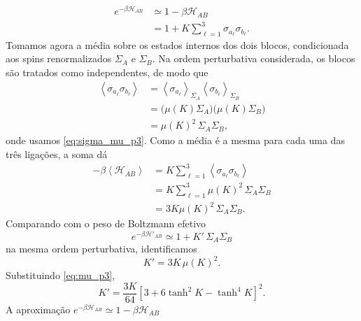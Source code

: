 \documentclass[12pt,a4paper]{article}
\begin{document}
%
\begin{align}
    e^{-\beta\mathcal H_{AB}}
    &\simeq
    1-\beta\mathcal H_{AB}
    \nonumber\\[4pt]
    &=
    1
    +
    K
    \sum_{\ell=1}^{3}
    \sigma_{a_\ell}\sigma_{b_\ell}.
    \label{eq:exp_pert_p3}
\end{align}
%
Tomamos agora a média sobre os estados internos dos dois blocos,
condicionada aos spins renormalizados \(\Sigma_A\) e \(\Sigma_B\). Na
ordem perturbativa considerada, os blocos são tratados como
independentes, de modo que
%
\begin{align}
    \left\langle
        \sigma_{a_\ell}\sigma_{b_\ell}
    \right\rangle
    &=
    \left\langle
        \sigma_{a_\ell}
    \right\rangle_{\Sigma_A}
    \left\langle
        \sigma_{b_\ell}
    \right\rangle_{\Sigma_B}
    \nonumber\\[4pt]
    &=
    \bigl(\mu(K)\Sigma_A\bigr)
    \bigl(\mu(K)\Sigma_B\bigr)
    \nonumber\\[4pt]
    &=
    \mu(K)^2\,\Sigma_A\Sigma_B,
    \label{eq:product_avg_p3}
\end{align}
%
onde usamos \eqref{eq:sigma_mu_p3}. Como a média é a mesma para cada
uma das três ligações, a soma dá
%
\begin{align}
    -\beta
    \left\langle
        \mathcal H_{AB}
    \right\rangle
    &=
    K
    \sum_{\ell=1}^{3}
    \left\langle
        \sigma_{a_\ell}\sigma_{b_\ell}
    \right\rangle
    \nonumber\\[4pt]
    &=
    K
    \sum_{\ell=1}^{3}
    \mu(K)^2\,\Sigma_A\Sigma_B
    \nonumber\\[4pt]
    &=
    3K\mu(K)^2\,\Sigma_A\Sigma_B.
    \label{eq:HAB_avg_p3}
\end{align}
%
Comparando com o peso de Boltzmann efetivo
%
\begin{equation}
    e^{-\beta\mathcal H'_{AB}}
    \simeq
    1+K'\,\Sigma_A\Sigma_B
\end{equation}
%
na mesma ordem perturbativa, identificamos
%
\begin{equation}
    \boxed{
    K'
    =
    3K\,\mu(K)^2.
    }
    \label{eq:RG_cross}
\end{equation}
%
Substituindo \eqref{eq:mu_p3},
%
\begin{equation}
    \boxed{
    K'
    =
    \frac{3K}{64}
    \left[
        3+6\tanh^2K-\tanh^4K
    \right]^2.
    }
    \label{eq:RG_cross_explicit}
\end{equation}
%
A aproximação \(e^{-\beta\mathcal H_{AB}}\simeq 1-\beta\mathcal H_{AB}\)
\end{document}
